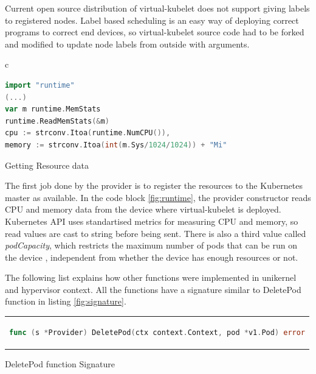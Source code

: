 Current open source distribution of virtual-kubelet does not support giving labels to registered nodes. Label based scheduling is an easy way of deploying correct programs to correct end devices, so virtual-kubelet source code had to be forked and modified to update node labels from outside with arguments.

\begin{code}[htpb]
  \centering
  \begin{tabular}{c}
  \begin{lstlisting}[language=go]
import "runtime"
(...)
var m runtime.MemStats
runtime.ReadMemStats(&m)
cpu := strconv.Itoa(runtime.NumCPU()),
memory := strconv.Itoa(int(m.Sys/1024/1024)) + "Mi"

\end{lstlisting}
\end{tabular}
\caption{Getting Resource data}\label{fig:runtime}
\end{code}

The first job done by the provider is to register the resources to the Kubernetes master as available. In the code block \ref{fig:runtime}, the provider constructor reads CPU and memory data from the device where virtual-kubelet is deployed. Kubernetes API uses standartised metrics for measuring CPU and memory, so read values are cast to string before being sent. There is also a third value called \textit{podCapacity}, which restricts the maximum number of pods that can be run on the device , independent from whether the device has enough resources or not.



The following list explains how other functions were implemented in unikernel and hypervisor context. All the functions have a signature similar to DeletePod function in listing \ref{fig:signature}.

\begin{code}[htpb]
  \centering
  \begin{tabular}{c}
  \begin{lstlisting}[language=go]
    func (s *Provider) DeletePod(ctx context.Context, pod *v1.Pod) error
\end{lstlisting}
\end{tabular}
\caption{DeletePod function Signature}\label{fig:signature}
\end{code}


